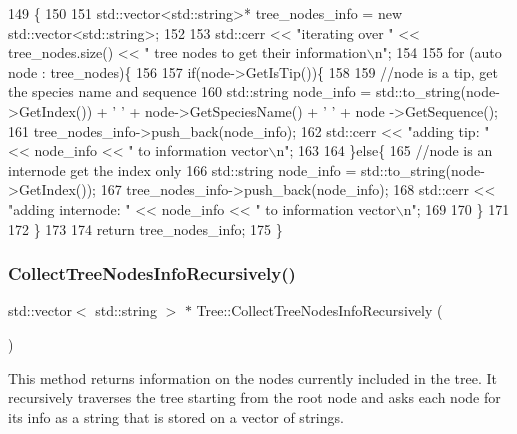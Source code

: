 \begin{DoxyCode}
149                                                            \{
150   
151   std::vector<std::string>* tree\_nodes\_info = \textcolor{keyword}{new} std::vector<std::string>;
152   
153   std::cerr << \textcolor{stringliteral}{"iterating over "} << tree\_nodes.size() << \textcolor{stringliteral}{" tree nodes to get their information\(\backslash\)n"};
154   
155   \textcolor{keywordflow}{for} (\textcolor{keyword}{auto} node : tree\_nodes)\{
156     
157     \textcolor{keywordflow}{if}(node->GetIsTip())\{
158       
159       \textcolor{comment}{//node is a tip, get the species name and sequence}
160       std::string node\_info = std::to\_string(node->GetIndex()) + \textcolor{charliteral}{' '} + node->GetSpeciesName() + \textcolor{charliteral}{' '} + node
      ->GetSequence();
161       tree\_nodes\_info->push\_back(node\_info);
162       std::cerr << \textcolor{stringliteral}{"adding tip: "} << node\_info << \textcolor{stringliteral}{" to information vector\(\backslash\)n"};
163       
164     \}\textcolor{keywordflow}{else}\{
165       \textcolor{comment}{//node is an internode get the index only}
166       std::string node\_info = std::to\_string(node->GetIndex());
167       tree\_nodes\_info->push\_back(node\_info);
168       std::cerr << \textcolor{stringliteral}{"adding internode: "} << node\_info << \textcolor{stringliteral}{" to information vector\(\backslash\)n"};
169       
170     \}
171     
172   \}
173   
174   \textcolor{keywordflow}{return} tree\_nodes\_info;
175 \}
\end{DoxyCode}
\mbox{\label{classTree_af09073cc7b7166d16213614b624f3388}} 
\subsubsection{\texorpdfstring{Collect\+Tree\+Nodes\+Info\+Recursively()}{CollectTreeNodesInfoRecursively()}}
{\footnotesize\ttfamily std\+::vector$<$ std\+::string $>$ $\ast$ Tree\+::\+Collect\+Tree\+Nodes\+Info\+Recursively (\begin{DoxyParamCaption}{ }\end{DoxyParamCaption})}

This method returns information on the nodes currently included in the tree. It recursively traverses the tree starting from the root node and asks each node for its info as a string that is stored on a vector of strings.

